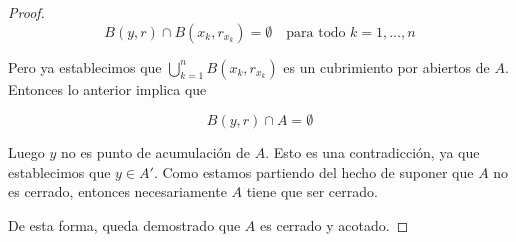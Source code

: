 \begin{proof}
    \[
    B(y, r) \cap B(x_k, r_{x_k}) = \emptyset \quad \text{para todo $k=1, \dots, n$}
    \]
    
    Pero ya establecimos que $\bigcup_{k=1}^n B(x_k, r_{x_k})$ es un cubrimiento por abiertos de $A$. Entonces lo anterior implica que
    
    \[
    B(y, r) \cap A = \emptyset
    \]
    
    Luego $y$ no es punto de acumulación de $A$. Esto es una contradicción, ya que establecimos que $y \in A'$. Como estamos partiendo del hecho de suponer que $A$ no es cerrado, entonces necesariamente $A$ tiene que ser cerrado.
    
    De esta forma, queda demostrado que $A$ es cerrado y acotado.
\end{proof}
